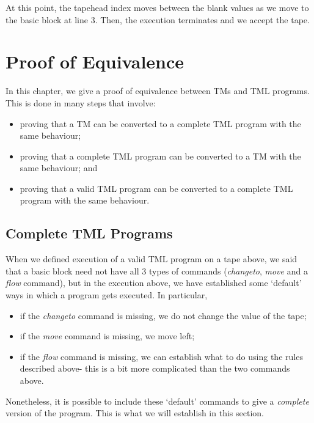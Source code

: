 \begin{appendices}
\begin{figure}[H]
\end{figure}
\noindent At this point, the tapehead index moves between the blank values as we move to the basic block at line 3. Then, the execution terminates and we accept the tape.

\chapter{Proof of Equivalence}
In this chapter, we give a proof of equivalence between TMs and TML programs. This is done in many steps that involve:
\begin{itemize}
    \item proving that a TM can be converted to a complete TML program with the same behaviour;
    \item proving that a complete TML program can be converted to a TM with the same behaviour; and
    \item proving that a valid TML program can be converted to a complete TML program with the same behaviour.
\end{itemize}

\section{Complete TML Programs}
When we defined execution of a valid TML program on a tape above, we said that a basic block need not have all 3 types of commands (\textit{changeto}, \textit{move} and a \textit{flow} command), but in the execution above, we have established some `default' ways in which a program gets executed. In particular,
\begin{itemize}
    \item if the \textit{changeto} command is missing, we do not change the value of the tape;
    \item if the \textit{move} command is missing, we move left;
    \item if the \textit{flow} command is missing, we can establish what to do using the rules described above- this is a bit more complicated than the two commands above.
\end{itemize}
Nonetheless, it is possible to include these `default' commands to give a \emph{complete} version of the program. This is what we will establish in this section. 


\end{appendices}
